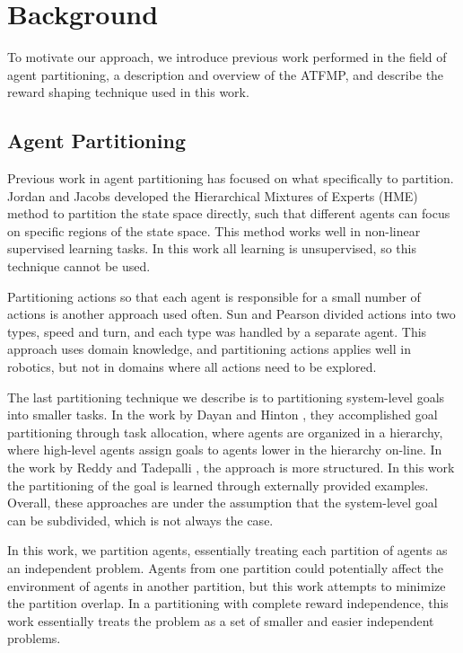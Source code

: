 \documentclass[letterpaper]{article}
\begin{document}
\section{Background}
\label{sec:BACKGROUND}

To motivate our approach, we introduce previous work performed in the field of agent partitioning, a description and overview of the ATFMP, and describe the reward shaping technique used in this work.

\subsection{Agent Partitioning}

Previous work in agent partitioning has focused on what specifically to partition. Jordan and Jacobs \cite{716791} developed the Hierarchical Mixtures of Experts (HME) method to partition the state space directly, such that different agents can focus on specific regions of the state space. This method works well in non-linear supervised learning tasks. In this work all learning is unsupervised, so this technique cannot be used.

Partitioning actions so that each agent is responsible for a small number of actions is another approach used often. Sun and Pearson \cite{Sun98someexperiments} divided actions into two types, speed and turn, and each type was handled by a separate agent. This approach uses domain knowledge, and partitioning actions applies well in robotics, but not in domains where all actions need to be explored.

The last partitioning technique we describe is to partitioning system-level goals into smaller tasks. In the work by Dayan and Hinton \cite{Dayan93feudalreinforcement}, they accomplished goal partitioning through task allocation, where agents are organized in a hierarchy, where high-level agents assign goals to agents lower in the hierarchy on-line. In the work by Reddy and Tadepalli \cite{Reddy_learninggoal-decomposition}, the approach is more structured. In this work the partitioning of the goal is learned through externally provided examples. Overall, these approaches are under the assumption that the system-level goal can be subdivided, which is not always the case. 

In this work, we partition agents, essentially treating each partition of agents as an independent problem. Agents from one partition could potentially affect the environment of agents in another partition, but this work attempts to minimize the partition overlap. In a partitioning with complete reward independence, this work essentially treats the problem as a set of smaller and easier independent problems.
\end{document}
